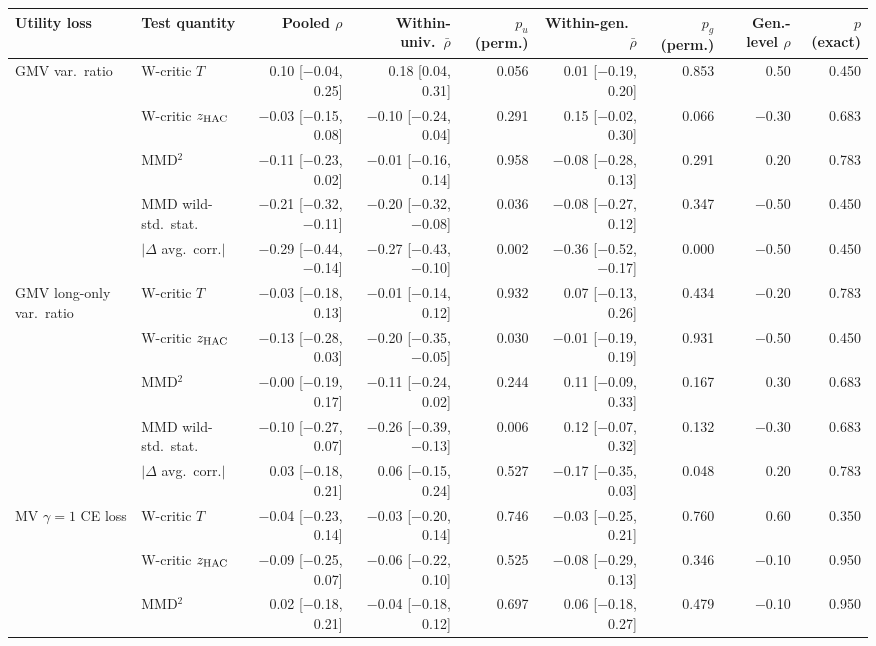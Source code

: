 \begin{tabular}{llrrrrrrr}
\toprule
Utility loss & Test quantity & Pooled $\rho$ & Within-univ.\ $\bar\rho$ & $p_u$ (perm.) & Within-gen.\ $\bar\rho$ & $p_g$ (perm.) & Gen.-level $\rho$ & $p$ (exact) \\
\midrule
GMV var.\ ratio & W-critic $T$ & 0.10 [$-$0.04, 0.25] & 0.18 [0.04, 0.31] & 0.056 & 0.01 [$-$0.19, 0.20] & 0.853 & 0.50 & 0.450 \\
 & W-critic $z_{\rm HAC}$ & $-$0.03 [$-$0.15, 0.08] & $-$0.10 [$-$0.24, 0.04] & 0.291 & 0.15 [$-$0.02, 0.30] & 0.066 & $-$0.30 & 0.683 \\
 & MMD$^2$ & $-$0.11 [$-$0.23, 0.02] & $-$0.01 [$-$0.16, 0.14] & 0.958 & $-$0.08 [$-$0.28, 0.13] & 0.291 & 0.20 & 0.783 \\
 & MMD wild-std.\ stat. & $-$0.21 [$-$0.32, $-$0.11] & $-$0.20 [$-$0.32, $-$0.08] & 0.036 & $-$0.08 [$-$0.27, 0.12] & 0.347 & $-$0.50 & 0.450 \\
 & $|\Delta$ avg.\ corr.$|$ & $-$0.29 [$-$0.44, $-$0.14] & $-$0.27 [$-$0.43, $-$0.10] & 0.002 & $-$0.36 [$-$0.52, $-$0.17] & 0.000 & $-$0.50 & 0.450 \\
GMV long-only var.\ ratio & W-critic $T$ & $-$0.03 [$-$0.18, 0.13] & $-$0.01 [$-$0.14, 0.12] & 0.932 & 0.07 [$-$0.13, 0.26] & 0.434 & $-$0.20 & 0.783 \\
 & W-critic $z_{\rm HAC}$ & $-$0.13 [$-$0.28, 0.03] & $-$0.20 [$-$0.35, $-$0.05] & 0.030 & $-$0.01 [$-$0.19, 0.19] & 0.931 & $-$0.50 & 0.450 \\
 & MMD$^2$ & $-$0.00 [$-$0.19, 0.17] & $-$0.11 [$-$0.24, 0.02] & 0.244 & 0.11 [$-$0.09, 0.33] & 0.167 & 0.30 & 0.683 \\
 & MMD wild-std.\ stat. & $-$0.10 [$-$0.27, 0.07] & $-$0.26 [$-$0.39, $-$0.13] & 0.006 & 0.12 [$-$0.07, 0.32] & 0.132 & $-$0.30 & 0.683 \\
 & $|\Delta$ avg.\ corr.$|$ & 0.03 [$-$0.18, 0.21] & 0.06 [$-$0.15, 0.24] & 0.527 & $-$0.17 [$-$0.35, 0.03] & 0.048 & 0.20 & 0.783 \\
MV $\gamma=1$ CE loss & W-critic $T$ & $-$0.04 [$-$0.23, 0.14] & $-$0.03 [$-$0.20, 0.14] & 0.746 & $-$0.03 [$-$0.25, 0.21] & 0.760 & 0.60 & 0.350 \\
 & W-critic $z_{\rm HAC}$ & $-$0.09 [$-$0.25, 0.07] & $-$0.06 [$-$0.22, 0.10] & 0.525 & $-$0.08 [$-$0.29, 0.13] & 0.346 & $-$0.10 & 0.950 \\
 & MMD$^2$ & 0.02 [$-$0.18, 0.21] & $-$0.04 [$-$0.18, 0.12] & 0.697 & 0.06 [$-$0.18, 0.27] & 0.479 & $-$0.10 & 0.950 \\

\end{tabular}
